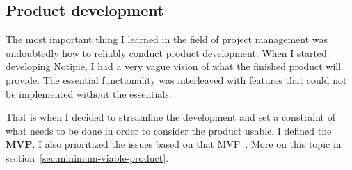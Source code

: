 \subsection{Product development}\label{sec:product-development}

The most important thing
I learned in the field of project management
was undoubtedly how to reliably conduct product development.
When I started devel\-oping Notipie,
I had a very vague vision
of what the finished product will provide.
The essential functionality was interleaved with features
that could not be implemented without the essentials.

That is when I decided to streamline the development
and set a constraint of what needs to be done
in order to consider the product usable.
I defined the \textbf{\acf{MVP}}.
I also prioritized the issues
based on that \ac{MVP}~\cite{sewera_issues_2022}.
More on this topic in section~\ref{sec:minimum-viable-product}.
